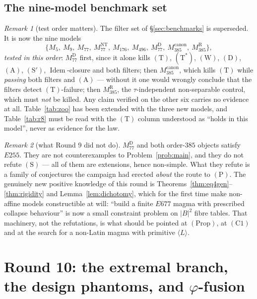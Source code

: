 \documentclass[11pt]{article}
\theoremstyle{plain}
\theoremstyle{definition}
\theoremstyle{remark}
\newtheorem*{remark*}{Remark}
\numberwithin{equation}{section}
\newcommand{\Idem}{\operatorname{Idem}}
\begin{document}
\subsection{The nine-model benchmark set}\label{sec:bench9}

\begin{remark*}[test order matters]
The filter set of \S\ref{sec:benchmarks} is superseded. It is now the nine models
\[
  \{M_5,\ M_9,\ M_{77},\ M_{77}^{\mathrm{NT}},\ M_{176},\ M_{496},\
  M_{77}^{\mathrm{D}},\ M_{385}^{\mathrm{canon}},\ M_{385}^{\mathrm{R}}\},
\]
\emph{tested in this order}: $M_{77}^{\mathrm{D}}$ first, since it alone kills
$(\mathrm{T})$, $(\mathrm{T}^{*})$, $(\mathrm{W})$, $(\mathrm{D})$,
$(\mathrm{A})$, $(\mathrm{S}')$, $\Idem$-closure and both filters; then
$M_{385}^{\mathrm{canon}}$, which kills $(\mathrm{T})$ while \emph{passing} both
filters and $(\mathrm{A})$ --- without it one would wrongly conclude that the
filters detect $(\mathrm{T})$-failure; then $M_{385}^{\mathrm{R}}$, the
$\tau$-independent non-separable control, which must \emph{not} be killed. Any
claim verified on the other six carries no evidence at all. Table~\ref{tab:zoo}
has been extended with the three new models, and Table~\ref{tab:r8} must be read
with the $(\mathrm{T})$ column understood as ``holds in this model'', never as
evidence for the law.
\end{remark*}

\begin{remark*}[what Round 9 did not do]
$M_{77}^{\mathrm{D}}$ and both order-$385$ objects satisfy $E255$. They are not
counterexamples to Problem~\ref{prob:main}, and they do not refute
$(\mathrm{S})$ --- all of them are extensions, hence non-simple. What they refute
is a family of conjectures the campaign had erected \emph{about} the route to
$(\mathrm{P})$. The genuinely new positive knowledge of this round is
Theorems~\ref{thm:eq4gen}--\ref{thm:rigidity} and Lemma~\ref{lem:dichotomy},
which for the first time make non-affine models constructible at will: ``build a
finite $E677$ magma with prescribed collapse behaviour'' is now a small constraint
problem on $|B|^2$ fibre tables. That machinery, not the refutations, is what
should be pointed at $(\mathrm{Prop})$, at $(\mathrm{C1})$ and at the search for a
non-Latin magma with primitive $\langle L\rangle$.
\end{remark*}

\section{Round 10: the extremal branch, the design phantoms, and
$\varphi$-fusion}\label{sec:round10}
\end{document}
